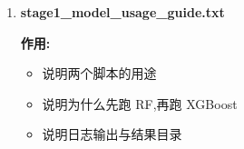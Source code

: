 \documentclass[lang=cn,scheme=chinese,color=blue,device=normal,toc=onecol,math=cm]{elegantbook}
\begin{document}
\begin{enumerate}
\textbf{作用:}\par
 
\begin{itemize}
\item 第一阶段正式主模型
\item 用 XGBoost 学 8 参数 -> \texttt{is\_\allowbreak{}physical\_\allowbreak{}insulator}
\item 作为后续 \texttt{is\_\allowbreak{}topo\_\allowbreak{}by\_\allowbreak{}chern /\allowbreak{} boundary\_\allowbreak{}sensitive\_\allowbreak{}flag} 的模板
\end{itemize}
 
\textbf{输出目录:}\par
 
\begin{itemize}
\item \texttt{05\_\allowbreak{}ml\_\allowbreak{}models/\allowbreak{}levelA\_\allowbreak{}insulator/\allowbreak{}xgboost/\allowbreak{}}
\end{itemize}
 
\textbf{输出文件:}\par
 
\begin{itemize}
\item \texttt{metrics.txt}
\item \texttt{metrics.json}
\item \texttt{feature\_\allowbreak{}importance.csv}
\item \texttt{predictions\_\allowbreak{}test.csv}
\item \texttt{confusion\_\allowbreak{}matrix.png}
\item \texttt{model.joblib}
\end{itemize}
 
\textbf{日志:}\par
 
\begin{itemize}
\item \texttt{logs/\allowbreak{}ml/\allowbreak{}stage1\_\allowbreak{}xgboost\_\allowbreak{}is\_\allowbreak{}insulator.log}
\end{itemize}
\item \textbf{stage1\_\allowbreak{}model\_\allowbreak{}usage\_\allowbreak{}guide.txt}\par
 
\textbf{作用:}\par
 
\begin{itemize}
\item 说明两个脚本的用途
\item 说明为什么先跑 RF,再跑 XGBoost
\item 说明日志输出与结果目录
\end{itemize}
\end{enumerate}
\end{document}
